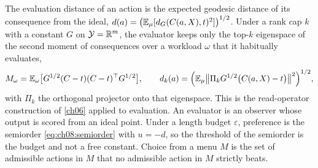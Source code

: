 The evaluation distance of an action is the expected geodesic distance of its consequence from the ideal, $d(a)=\big(\mathbb{E}_\mu[d_G(C(a,X),t)^2]\big)^{1/2}$. Under a rank cap $k$ with a constant $G$ on $\mathcal Y=\mathbb{R}^m$, the evaluator keeps only the top-$k$ eigenspace of the second moment of consequences over a workload $\omega$ that it habitually evaluates,
\begin{equation}\label{eq:ch08:budgeted}
M_\omega=\mathbb{E}_\omega\big[G^{1/2}(C-t)(C-t)^{\top} G^{1/2}\big],\qquad d_k(a)=\Big(\mathbb{E}_\mu\big\|\Pi_kG^{1/2}\big(C(a,X)-t\big)\big\|^2\Big)^{1/2},
\end{equation}
with $\Pi_k$ the orthogonal projector onto that eigenspace. This is the read-operator construction of \cref{ch06} applied to evaluation. An evaluator is an observer whose output is scored from an ideal point. Under a length budget $\varepsilon$, preference is the semiorder \eqref{eq:ch08:semiorder} with $u=-d$, so the threshold of the semiorder is the budget and not a free constant. Choice from a menu $M$ is the set of admissible actions in $M$ that no admissible action in $M$ strictly beats.


